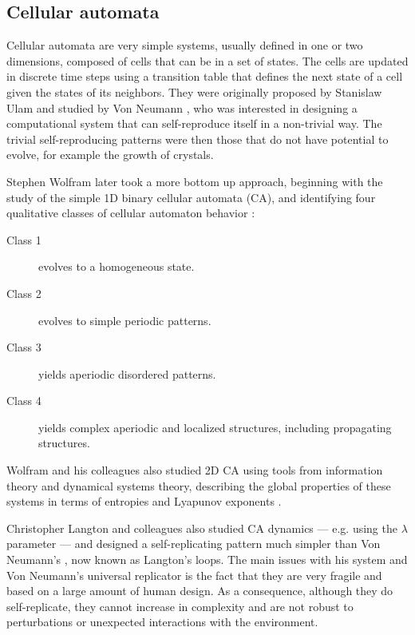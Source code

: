 \subsection{Cellular automata}

Cellular automata are very simple systems, usually defined in one or two
dimensions, composed of cells that can be in a set of states. The cells are
updated in discrete time steps using a transition table that defines the next
state of a cell given the states of its neighbors. They were originally proposed
by Stanislaw Ulam and studied by Von Neumann
\parencite{vonneumannTheorySelfreproducingAutomata1966}, who was interested in
designing a computational system that can self-reproduce itself in a non-trivial
way. The trivial self-reproducing patterns were then those that do not have
potential to evolve, for example the growth of crystals.

Stephen Wolfram later took a more bottom up approach, beginning with the study
of the simple 1D binary cellular automata (CA), and identifying four qualitative
classes of cellular automaton behavior
\parencite{wolframUniversalityComplexityCellular1984}:

\begin{description}
\item[Class 1]  evolves to a homogeneous state.
\item[Class 2]  evolves to simple periodic patterns.
\item[Class 3]  yields aperiodic disordered patterns.
\item[Class 4]  yields complex aperiodic and localized structures, including
  propagating structures.
\end{description}

Wolfram and his colleagues also studied 2D CA using tools from information
theory and dynamical systems theory, describing the global properties of these
systems in terms of entropies and Lyapunov exponents
\parencite{packardTwodimensionalCellularAutomata1985}.

Christopher Langton and colleagues also studied CA dynamics
\parencite{liTransitionPhenomenaCellular1990} --- e.g. using the $\lambda$ parameter
\parencite{langtonComputationEdgeChaos1990} --- and designed a self-replicating
pattern much simpler than Von Neumann's
\parencite{langtonSelfreproductionCellularAutomata1984}, now known as Langton's
loops. The main issues with his system and Von Neumann's universal replicator is
the fact that they are very fragile and based on a large amount of human design.
As a consequence, although they do self-replicate, they cannot increase in
complexity and are not robust to perturbations or unexpected interactions with
the environment.

